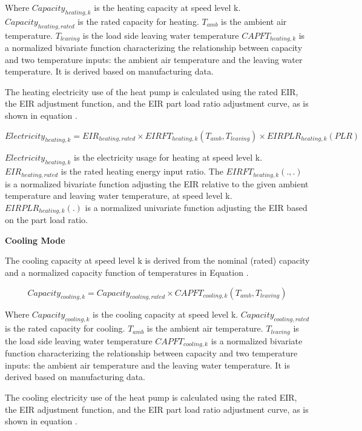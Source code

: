 Where $Capacity_{heating,k}$ is the heating capacity at speed level k.
$Capacity_{heating,rated}$ is the rated capacity for heating. $T_{amb}$ is the ambient air
temperature. $T_{leaving}$ is the load side leaving water temperature $CAPFT_{heating,k}$
is a normalized bivariate function characterizing the relationship between
capacity and two temperature inputs: the ambient air temperature and the leaving
water temperature. It is derived based on manufacturing data.

The heating electricity use of the heat pump is calculated using the rated EIR,
the EIR adjustment function, and the EIR part load ratio adjustment curve, as is
shown in equation .

\begin{equation}
Electricity_{heating,k}=EIR_{heating,rated} \times EIRFT_{heating,k}(T_{amb}, T_{leaving}) \times EIRPLR_{heating,k}(PLR)       
\end{equation}

$Electricity_{heating,k}$ is the electricity usage for heating at speed level k.
$EIR_{heating,rated}$ is the rated heating energy input ratio. The
$EIRFT_{heating,k}(., .)$ is a normalized bivariate function adjusting the EIR
relative to the given ambient temperature and leaving water temperature, at
speed level k. $EIRPLR_{heating,k}(.)$ is a normalized univariate function
adjusting the EIR based on the part load ratio.

\noindent\textbf{Cooling Mode}

The cooling capacity at speed level k is derived from the nominal (rated)
capacity and a normalized capacity function of temperatures in Equation .

\begin{equation}
Capacity_{cooling,k}=Capacity_{cooling,rated} \times CAPFT_{cooling,k}(T_{amb},T_{leaving})	                 
\end{equation}

Where $Capacity_{cooling,k}$ is the cooling capacity at speed level k.
$Capacity_{cooling,rated}$ is the rated capacity for cooling. $T_{amb}$ is the ambient air
temperature. $T_{leaving}$ is the load side leaving water temperature $CAPFT_{cooling,k}$
is a normalized bivariate function characterizing the relationship between
capacity and two temperature inputs: the ambient air temperature and the leaving
water temperature. It is derived based on manufacturing data.

The cooling electricity use of the heat pump is calculated using the rated EIR,
the EIR adjustment function, and the EIR part load ratio adjustment curve, as is
shown in equation .

